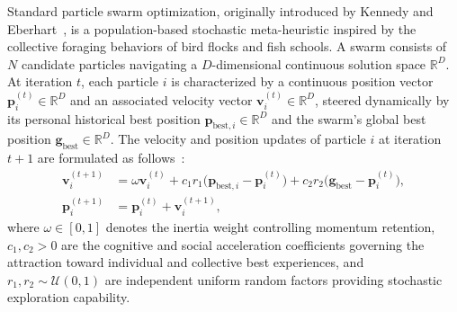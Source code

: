 \documentclass[final,5p,times,fleqn]{elsarticle}
\begin{document}
Standard particle swarm optimization, originally introduced by Kennedy and Eberhart~\cite{kennedy1995}, is a population-based stochastic meta-heuristic inspired by the collective foraging behaviors of bird flocks and fish schools. A swarm consists of $N$ candidate particles navigating a $D$-dimensional continuous solution space $\mathbb{R}^D$. At iteration $t$, each particle $i$ is characterized by a continuous position vector $\mathbf{p}_i^{(t)} \in \mathbb{R}^D$ and an associated velocity vector $\mathbf{v}_i^{(t)} \in \mathbb{R}^D$, steered dynamically by its personal historical best position $\mathbf{p}_{\mathrm{best},i} \in \mathbb{R}^D$ and the swarm's global best position $\mathbf{g}_{\mathrm{best}} \in \mathbb{R}^D$. The velocity and position updates of particle $i$ at iteration $t+1$ are formulated as follows~\cite{shi1998}:
\begin{align}
\mathbf{v}_i^{(t+1)} &= \omega \mathbf{v}_i^{(t)} + c_1 r_1 \bigl(\mathbf{p}_{\mathrm{best},i} - \mathbf{p}_i^{(t)}\bigr) + c_2 r_2 \bigl(\mathbf{g}_{\mathrm{best}} - \mathbf{p}_i^{(t)}\bigr), \label{eq:pso_velocity} \\
\mathbf{p}_i^{(t+1)} &= \mathbf{p}_i^{(t)} + \mathbf{v}_i^{(t+1)}, \label{eq:pso_position}
\end{align}
where $\omega \in [0, 1]$ denotes the inertia weight controlling momentum retention, $c_1, c_2 > 0$ are the cognitive and social acceleration coefficients governing the attraction toward individual and collective best experiences, and $r_1, r_2 \sim \mathcal{U}(0, 1)$ are independent uniform random factors providing stochastic exploration capability.
\end{document}
